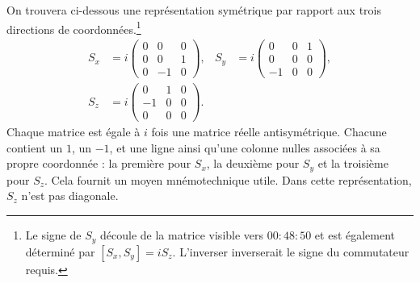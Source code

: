 On trouvera ci-dessous une représentation symétrique par rapport aux trois directions de coordonnées.\footnote{Le signe de \(S_y\) découle de la matrice visible vers \(00{:}48{:}50\) et est également déterminé par \([S_x,S_y]=iS_z\). L’inverser inverserait le signe du commutateur requis.}
\begin{equation}
\begin{aligned}
S_x
&=
i
\begin{pmatrix}
0&0&0\\
0&0&1\\
0&-1&0
\end{pmatrix},
&
S_y
&=
i
\begin{pmatrix}
0&0&1\\
0&0&0\\
-1&0&0
\end{pmatrix},\\
S_z
&=
i
\begin{pmatrix}
0&1&0\\
-1&0&0\\
0&0&0
\end{pmatrix}.
\end{aligned}
\end{equation}
Chaque matrice est égale à \(i\) fois une matrice réelle antisymétrique. Chacune contient un \(1\), un \(-1\), et une ligne ainsi qu’une colonne nulles associées à sa propre coordonnée : la première pour \(S_x\), la deuxième pour \(S_y\) et la troisième pour \(S_z\). Cela fournit un moyen mnémotechnique utile. Dans cette représentation, \(S_z\) n’est pas diagonale.

